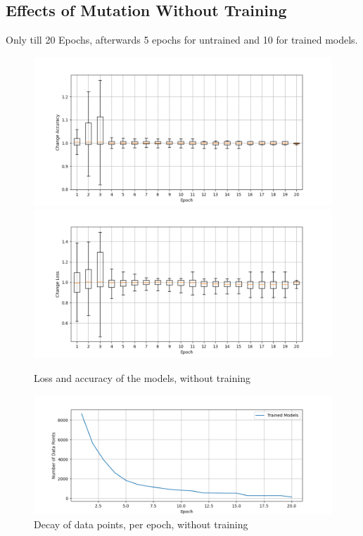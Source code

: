 \subsection{Effects of Mutation Without Training}\label{subsec:effects-of-mutation-without-training}
Only till 20 Epochs, afterwards 5 epochs for untrained and 10 for trained models.
\begin{figure}
    \centering
    \includegraphics[width=\textwidth]{plots/NotTrained_Change_Acc.png}
    \includegraphics[width=\textwidth]{plots/NotTrained_Change_Loss.png}
    \caption{Loss and accuracy of the models, without training}
    \label{fig:loss-accuracy-Notraining}
\end{figure}
\begin{figure}
    \centering
    \includegraphics[width=\textwidth]{plots/NotTrained_Points_perEpoch.png}
    \caption{Decay of data points, per epoch, without training}
    \label{fig:decay_Notraining}
\end{figure}
